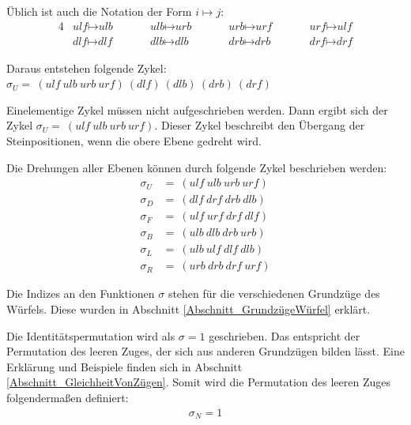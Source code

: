 \documentclass[12pt,a4paper, usenames, dvipsnames]{article}
\theoremstyle{mystyle}
\theoremstyle{definition}
\begin{document}
Üblich ist auch die Notation der Form $i \mapsto j$: 
\begin{alignat*}{4}
& \textit{ulf} \mapsto \textit{ulb} \ \ \ \ \ \ \ \ && \textit{ulb} \mapsto \textit{urb} \ \ \ \ \ \ \ \ && \textit{urb} \mapsto \textit{urf} \ \ \ \ \ \ \ \ && \textit{urf} \mapsto \textit{ulf} \\
& \textit{dlf} \mapsto \textit{dlf} \ \ \ \ \ \ \ \ && \textit{dlb} \mapsto \textit{dlb} \ \ \ \ \ \ \ \ \ && \textit{drb} \mapsto \textit{drb} \ \ \ \ \ \ \ \ && \textit{drf} \mapsto \textit{drf} 
\end{alignat*}

Daraus entstehen folgende Zykel: $\sigma_U = \ ( \textit{ulf} \ \textit{ulb} \ \textit{urb} \ \textit{urf} )\ ( \textit{dlf} )\ ( \textit{dlb} )\ ( \textit{drb} )\ ( \textit{drf} )$

Einelementige Zykel müssen nicht aufgeschrieben werden. Dann ergibt sich der Zykel $\sigma_U = \ ( \textit{ulf} \ \textit{ulb} \ \textit{urb} \ \textit{urf} )$. Dieser Zykel beschreibt den Übergang der Steinpositionen, wenn die obere Ebene gedreht wird. 


Die Drehungen aller Ebenen können durch folgende Zykel beschrieben werden: 
\begin{align*}
\sigma_U & =\ ( \textit{ulf} \ \textit{ulb} \ \textit{urb} \ \textit{urf} ) \\
\sigma_D & =\ ( \textit{dlf} \ \textit{drf} \ \textit{drb} \ \textit{dlb} ) \\
\sigma_F & =\ ( \textit{ulf} \ \textit{urf} \ \textit{drf} \ \textit{dlf} ) \\
\sigma_B & =\ ( \textit{ulb} \ \textit{dlb} \ \textit{drb} \ \textit{urb} ) \\
\sigma_L & =\ ( \textit{ulb} \ \textit{ulf} \ \textit{dlf} \ \textit{dlb} ) \\
\sigma_R & =\ ( \textit{urb} \ \textit{drb} \ \textit{drf} \ \textit{urf} ) 
\end{align*}

Die Indizes an den Funktionen $\sigma$ stehen für die verschiedenen Grundzüge des Würfels. Diese wurden in Abschnitt \ref{Abschnitt_GrundzügeWürfel} erklärt.

Die Identitätspermutation wird als $\sigma=1$ geschrieben. Das entspricht der Permutation des leeren Zuges, der sich aus anderen Grundzügen bilden lässt. Eine Erklärung und Beispiele finden sich in Abschnitt \ref{Abschnitt_GleichheitVonZügen}.
Somit wird die Permutation des leeren Zuges folgendermaßen definiert:
\begin{align*}
\sigma_N = 1
\end{align*}
\end{document}
